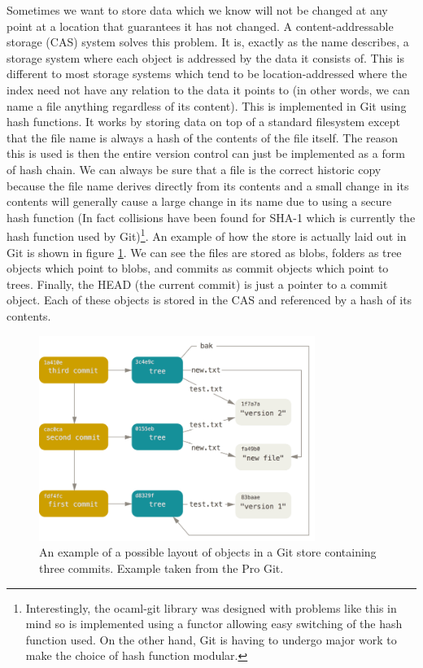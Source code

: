 Sometimes we want to store data which we know will not be changed at any point at a location that guarantees it has not changed. A content-addressable storage (CAS) system solves this problem. It is, exactly as the name describes, a storage system where each object is addressed by the data it consists of. This is different to most storage systems which tend to be location-addressed where the index need not have any relation to the data it points to (in other words, we can name a file anything regardless of its content). This is implemented in Git using hash functions. It works by storing data on top of a standard filesystem except that the file name is always a hash of the contents of the file itself. The reason this is used is then the entire version control can just be implemented as a form of hash chain. We can always be sure that a file is the correct historic copy because the file name derives directly from its contents and a small change in its contents will generally cause a large change in its name due to using a secure hash function (In fact collisions have been found for SHA-1 which is currently the hash function used by Git)\footnote{Interestingly, the ocaml-git library was designed with problems like this in mind so is implemented using a functor allowing easy switching of the hash function used. On the other hand, Git is having to undergo major work to make the choice of hash function modular\cite{git_transition}.}. An example of how the store is actually laid out in Git is shown in figure \ref{fig:gitdatamodel}. We can see the files are stored as blobs, folders as tree objects which point to blobs, and commits as commit objects which point to trees. Finally, the HEAD (the current commit) is just a pointer to a commit object. Each of these objects is stored in the CAS and referenced by a hash of its contents.

\begin{figure}[h]
  \center
  \includegraphics[width=0.8\textwidth]{figs/git-data-model}
  \caption{An example of a possible layout of objects in a Git store containing three commits. Example taken from the Pro Git\cite{chacon2014git}.}
  \label{fig:gitdatamodel}
\end{figure}

